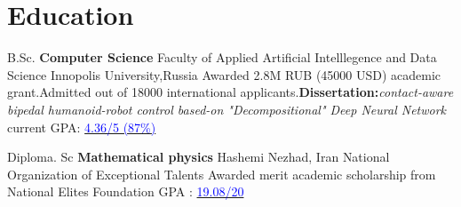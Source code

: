 \section{Education}
        \cventry{}
                {B.Sc. \textbf{Computer Science}}
                {Faculty of Applied Artificial Intelllegence and Data Science}
                {Innopolis University,Russia}
                {Awarded 2.8M RUB (45000 USD) academic grant.Admitted out of 18000 international applicants.\textbf{Dissertation:}\textit{contact-aware bipedal humanoid-robot control based-on "Decompositional" Deep Neural Network} }
                {current GPA: \href{https://drive.google.com/file/d/1oK1n1Cq0bO4Zk1kgftOBm5El64YeNCGk/view?usp=sharing}{\textcolor{blue}{4.36/5 (87\%)}} }
  
    \vspace{10pt}
    
    \cventry{}
            {Diploma. Sc \textbf{Mathematical physics}}
            {Hashemi Nezhad, Iran}
            {National Organization of Exceptional Talents}
            {Awarded merit academic scholarship from National Elites Foundation }
            {GPA : \href{https://drive.google.com/file/d/1N0k_16lOQtVe9FI5MGIu6QGJ8eLOUbus/view?usp=sharing}{\textcolor{blue}{19.08/20}}}